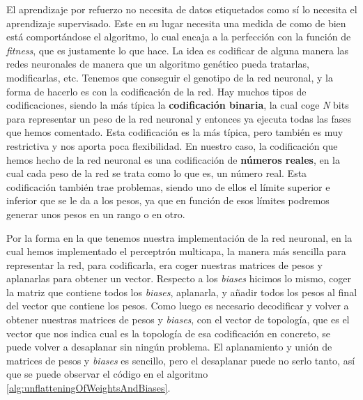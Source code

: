 El aprendizaje por refuerzo no necesita de datos etiquetados como sí lo necesita el aprendizaje supervisado. Este en su lugar necesita una medida de como de bien está comportándose el algoritmo, lo cual encaja a la perfección con la función de \textit{fitness}, que es justamente lo que hace. La idea es codificar de alguna manera las redes neuronales de manera que un algoritmo genético pueda tratarlas, modificarlas, etc. Tenemos que conseguir el genotipo de la red neuronal, y la forma de hacerlo es con la codificación de la red. Hay muchos tipos de codificaciones, siendo la más típica la \textbf{codificación binaria}, la cual coge \textit{N} bits para representar un peso de la red neuronal y entonces ya ejecuta todas las fases que hemos comentado. Esta codificación es la más típica, pero también es muy restrictiva y nos aporta poca flexibilidad. En nuestro caso, la codificación que hemos hecho de la red neuronal es una codificación de \textbf{números reales}, en la cual cada peso de la red se trata como lo que es, un número real. Esta codificación también trae problemas, siendo uno de ellos el límite superior e inferior que se le da a los pesos, ya que en función de esos límites podremos generar unos pesos en un rango o en otro.

Por la forma en la que tenemos nuestra implementación de la red neuronal, en la cual hemos implementado el perceptrón multicapa, la manera más sencilla para representar la red, para codificarla, era coger nuestras matrices de pesos y aplanarlas para obtener un vector. Respecto a los \textit{biases} hicimos lo mismo, coger la matriz que contiene todos los \textit{biases}, aplanarla, y añadir todos los pesos al final del vector que contiene los pesos. Como luego es necesario decodificar y volver a obtener nuestras matrices de pesos y \textit{biases}, con el vector de topología, que es el vector que nos indica cual es la topología de esa codificación en concreto, se puede volver a desaplanar sin ningún problema. El aplanamiento y unión de matrices de pesos y \textit{biases} es sencillo, pero el desaplanar puede no serlo tanto, así que se puede observar el código en el algoritmo \ref{alg:unflatteningOfWeightsAndBiases}.

